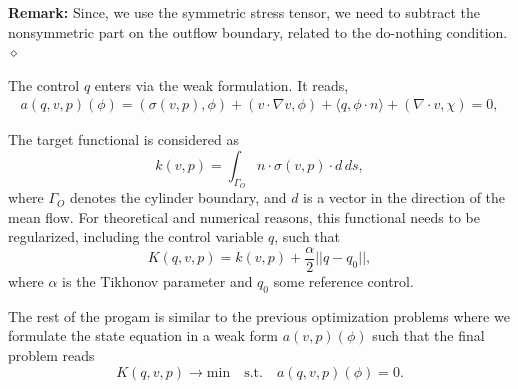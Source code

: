 \textbf{Remark:} Since, we use the 
symmetric stress tensor, we need to subtract the nonsymmetric part 
on the outflow boundary, related to the do-nothing condition.
$\diamond$

The control $q$ enters via the weak formulation. It reads,
\begin{align*}
a(q,v,p)(\phi) = (\sigma(v,p), \phi) + (v\cdot \nabla v, \phi) 
+ \langle q, \phi\cdot n \rangle + (\nabla\cdot v, \chi) = 0,
\end{align*}




The target functional is considered as 
\[
k(v,p) = \int_{\Gamma_O} n\cdot \sigma(v,p)\cdot d \, ds,
\]
where $\Gamma_O$ denotes the cylinder boundary, and $d$ is a vector in the
direction
of the mean flow. For theoretical and numerical reasons, this functional 
needs to be regularized, including the control variable $q$, such that
\[
K(q,v,p) = k(v,p) + \frac{\alpha}{2}||q - q_0||,
\] 
where $\alpha$ is the Tikhonov parameter and $q_0$ some 
reference control. 

The rest of the progam is similar to the previous optimization problems where
we formulate the state equation in a weak form $a(v,p)(\phi)$ such that the 
final problem reads
\[
K(q,v,p) \rightarrow \text{min} \quad \text{s.t.} \quad a(q,v,p)(\phi) = 0.
\]

